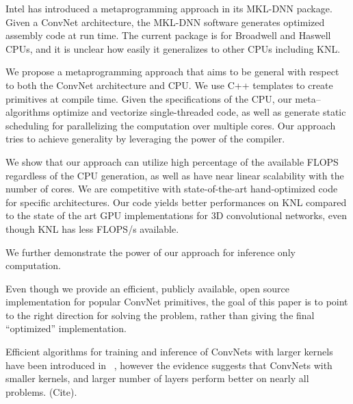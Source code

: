   Intel has introduced a metaprogramming approach in its MKL-DNN
  package.  Given a ConvNet architecture, the MKL-DNN software
  generates optimized assembly code at run time.  The current package
  is for Broadwell and Haswell CPUs, and it is unclear how easily it
  generalizes to other CPUs including KNL.
  
  We propose a metaprogramming approach that aims to be general with
  respect to both the ConvNet architecture and CPU.  We use C++
  templates to create primitives at compile time.  Given the
  specifications of the CPU, our meta--algorithms optimize and
  vectorize single-threaded code, as well as generate static
  scheduling for parallelizing the computation over multiple cores.
  Our approach tries to achieve generality by leveraging the power of
  the compiler.

  We show that our approach can utilize high percentage of the
  available FLOPS regardless of the CPU generation, as well as have
  near linear scalability with the number of cores.  We are
  competitive with state-of-the-art hand-optimized code for specific
  architectures.  Our code yields better performances on KNL
  compared to the state of the art GPU implementations for 3D
  convolutional networks, even though KNL has less FLOPS/s available.

  We further demonstrate the power of our approach for inference only
  computation.


  Even though we provide an efficient, publicly available, open source
  implementation for popular ConvNet primitives, the goal of this
  paper is to point to the right direction for solving the problem,
  rather than giving the final ``optimized'' implementation.

  Efficient algorithms for training and inference of ConvNets with
  larger kernels have been introduced in
  ~\cite{zlateski2016znn,zlateski2016znni}, however the evidence
  suggests that ConvNets with smaller kernels, and larger number of
  layers perform better on nearly all problems. (Cite).


